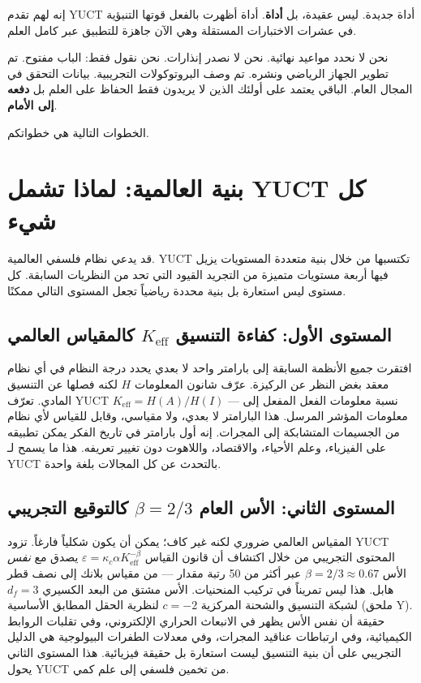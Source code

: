 \documentclass[12pt,a4paper]{article}
\newcommand{\Keff}{K_{\mathrm{eff}}}
\begin{document}
	إنه لهم تقدم YUCT أداة جديدة. ليس عقيدة، بل \textbf{أداة}. أداة أظهرت بالفعل قوتها التنبؤية في عشرات الاختبارات المستقلة وهي الآن جاهزة للتطبيق عبر كامل العلم.
	
	نحن لا نحدد مواعيد نهائية. نحن لا نصدر إنذارات. نحن نقول فقط: الباب مفتوح. تم تطوير الجهاز الرياضي ونشره. تم وصف البروتوكولات التجريبية. بيانات التحقق في المجال العام. الباقي يعتمد على أولئك الذين لا يريدون فقط الحفاظ على العلم بل \textbf{دفعه إلى الأمام}.
	
	الخطوات التالية هي خطواتكم.
	
	\section{بنية العالمية: لماذا تشمل YUCT كل شيء}
	\label{sec:architecture-of-universality}
	
	قد يدعي نظام فلسفي العالمية. YUCT تكتسبها من خلال بنية متعددة المستويات يزيل فيها أربعة مستويات متميزة من التجريد القيود التي تحد من النظريات السابقة. كل مستوى ليس استعارة بل بنية محددة رياضياً تجعل المستوى التالي ممكنًا.
	
	\subsection{المستوى الأول: كفاءة التنسيق \(K_{\mathrm{eff}}\) كالمقياس العالمي}
	
	افتقرت جميع الأنظمة السابقة إلى بارامتر واحد لا بعدي يحدد درجة النظام في أي نظام معقد بغض النظر عن الركيزة. عرّف شانون المعلومات \(H\) لكنه فصلها عن التنسيق المادي. تعرّف YUCT \(\Keff = H(A)/H(I)\) — نسبة معلومات الفعل المفعل إلى معلومات المؤشر المرسل. هذا البارامتر لا بعدي، ولا مقياسي، وقابل للقياس لأي نظام من الجسيمات المتشابكة إلى المجرات. إنه أول بارامتر في تاريخ الفكر يمكن تطبيقه على الفيزياء، وعلم الأحياء، والاقتصاد، واللاهوت دون تغيير تعريفه. هذا ما يسمح لـ YUCT بالتحدث عن كل المجالات بلغة واحدة.
	
	\subsection{المستوى الثاني: الأس العام \(\beta = 2/3\) كالتوقيع التجريبي}
	
	المقياس العالمي ضروري لكنه غير كاف؛ يمكن أن يكون شكلياً فارغاً. تزود YUCT المحتوى التجريبي من خلال اكتشاف أن قانون القياس \(\varepsilon = \kappa_c \alpha \Keff^{-\beta}\) يصدق مع \emph{نفس} الأس \(\beta = 2/3 \approx 0.67\) عبر أكثر من 50 رتبة مقدار — من مقياس بلانك إلى نصف قطر هابل. هذا ليس تمريناً في تركيب المنحنيات. الأس مشتق من البعد الكسيري \(d_f = 3\) لشبكة التنسيق والشحنة المركزية \(c = -2\) لنظرية الحقل المطابق الأساسية (ملحق Y). حقيقة أن نفس الأس يظهر في الانبعاث الحراري الإلكتروني، وفي تقلبات الروابط الكيميائية، وفي ارتباطات عناقيد المجرات، وفي معدلات الطفرات البيولوجية هي الدليل التجريبي على أن بنية التنسيق ليست استعارة بل حقيقة فيزيائية. هذا المستوى الثاني يحول YUCT من تخمين فلسفي إلى علم كمي.
	
\end{document}
